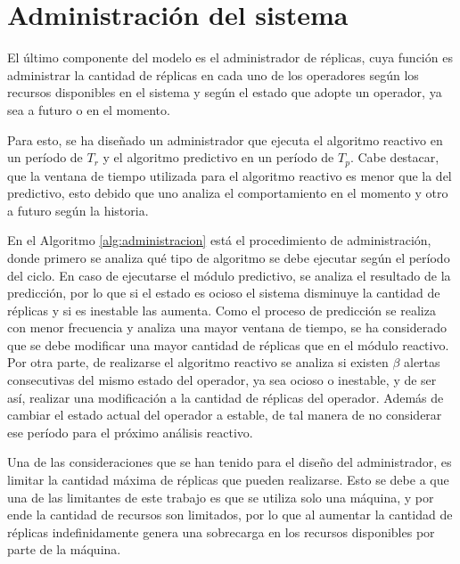 \section{Administraci\'on del sistema}

El \'ultimo componente del modelo es el administrador de r\'eplicas, cuya funci\'on es administrar la cantidad de r\'eplicas en cada uno de los operadores seg\'un los recursos disponibles en el sistema y seg\'un el estado que adopte un operador, ya sea a futuro o en el momento.


\normalsize{Para esto, se ha dise\~nado un administrador que ejecuta el algoritmo reactivo en un per\'iodo de $T_r$ y el algoritmo predictivo en un per\'iodo de $T_p$. Cabe destacar, que la ventana de tiempo utilizada para el algoritmo reactivo es menor que la del predictivo, esto debido que uno analiza el comportamiento en el momento y otro a futuro seg\'un la historia.}

En el Algoritmo \ref{alg:administracion} est\'a el procedimiento de administraci\'on, donde primero se analiza qu\'e tipo de algoritmo se debe ejecutar seg\'un el per\'iodo del ciclo. En caso de ejecutarse el m\'odulo predictivo, se analiza el resultado de la predicci\'on, por lo que si el estado es ocioso el sistema disminuye la cantidad de r\'eplicas y si es inestable las aumenta. Como el proceso de predicci\'on se realiza con menor frecuencia y analiza una mayor ventana de tiempo, se ha considerado que se debe modificar una mayor cantidad de r\'eplicas que en el m\'odulo reactivo. Por otra parte, de realizarse el algoritmo reactivo se analiza si existen $\beta$ alertas consecutivas del mismo estado del operador, ya sea ocioso o inestable, y de ser as\'i, realizar una modificaci\'on a la cantidad de r\'eplicas del operador. Adem\'as de cambiar el estado actual del operador a estable, de tal manera de no considerar ese per\'iodo para el pr\'oximo an\'alisis reactivo.

Una de las consideraciones que se han tenido para el dise\~no del administrador, es limitar la cantidad m\'axima de r\'eplicas que pueden realizarse. Esto se debe a que una de las limitantes de este trabajo es que se utiliza solo una m\'aquina, y por ende la cantidad de recursos son limitados, por lo que al aumentar la cantidad de r\'eplicas indefinidamente genera una sobrecarga en los recursos disponibles por parte de la m\'aquina.

